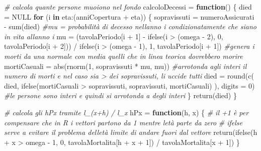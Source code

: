 \documentclass[
]{article}
\newenvironment{Shaded}{\begin{snugshade}}{\end{snugshade}}
\newcommand{\AttributeTok}[1]{\textcolor[rgb]{0.77,0.63,0.00}{#1}}
\newcommand{\CommentTok}[1]{\textcolor[rgb]{0.56,0.35,0.01}{\textit{#1}}}
\newcommand{\ConstantTok}[1]{\textcolor[rgb]{0.00,0.00,0.00}{#1}}
\newcommand{\ControlFlowTok}[1]{\textcolor[rgb]{0.13,0.29,0.53}{\textbf{#1}}}
\newcommand{\DecValTok}[1]{\textcolor[rgb]{0.00,0.00,0.81}{#1}}
\newcommand{\FunctionTok}[1]{\textcolor[rgb]{0.00,0.00,0.00}{#1}}
\newcommand{\NormalTok}[1]{#1}
\newcommand{\OtherTok}[1]{\textcolor[rgb]{0.56,0.35,0.01}{#1}}
\newcommand{\SpecialCharTok}[1]{\textcolor[rgb]{0.00,0.00,0.00}{#1}}
\begin{document}
\begin{Shaded}
\begin{Highlighting}[]
  \CommentTok{\# calcola quante persone muoiono nel fondo}
\NormalTok{  calcoloDecessi }\OtherTok{=} \ControlFlowTok{function}\NormalTok{()}
\NormalTok{  \{}
\NormalTok{    died }\OtherTok{=} \ConstantTok{NULL}
    \ControlFlowTok{for}\NormalTok{ (i }\ControlFlowTok{in}\NormalTok{ eta}\SpecialCharTok{:}\NormalTok{(anniCopertura }\SpecialCharTok{+}\NormalTok{ eta))}
\NormalTok{    \{}
\NormalTok{      sopravissuti }\OtherTok{=}\NormalTok{ numeroAssicurati }\SpecialCharTok{{-}} \FunctionTok{sum}\NormalTok{(died)}
      \CommentTok{\#mu = probabilità di decesso nell\textquotesingle{}anno i condizionatamente che siano in vita all\textquotesingle{}anno i}
\NormalTok{      mu }\OtherTok{=}\NormalTok{  (tavolaPeriodo[i }\SpecialCharTok{+} \DecValTok{1}\NormalTok{] }\SpecialCharTok{{-}} \FunctionTok{ifelse}\NormalTok{(i }\SpecialCharTok{\textgreater{}}\NormalTok{ (omega }\SpecialCharTok{{-}} \DecValTok{2}\NormalTok{), }\DecValTok{0}\NormalTok{, tavolaPeriodo[i }\SpecialCharTok{+}
                                                                               \DecValTok{2}\NormalTok{])) }\SpecialCharTok{/} \FunctionTok{ifelse}\NormalTok{(i }\SpecialCharTok{\textgreater{}}\NormalTok{ (omega }\SpecialCharTok{{-}} \DecValTok{1}\NormalTok{), }\DecValTok{1}\NormalTok{, tavolaPeriodo[i }\SpecialCharTok{+} \DecValTok{1}\NormalTok{])}
      \CommentTok{\#genera i morti da una normale con media quelli che in linea teorica dovrebbero morire}
\NormalTok{      mortiCasuali }\OtherTok{=} \FunctionTok{abs}\NormalTok{(}\FunctionTok{rnorm}\NormalTok{(}\DecValTok{1}\NormalTok{, sopravissuti }\SpecialCharTok{*}\NormalTok{ mu, mu))}
      \CommentTok{\#arrotonda agli interi il numero di morti e nel caso sia \textgreater{} dei sopravissuti, li uccide tutti}
\NormalTok{      died }\OtherTok{=} \FunctionTok{round}\NormalTok{(}\FunctionTok{c}\NormalTok{(}
\NormalTok{        died,}
        \FunctionTok{ifelse}\NormalTok{(mortiCasuali }\SpecialCharTok{\textgreater{}}\NormalTok{ sopravissuti, sopravissuti, mortiCasuali)}
\NormalTok{      ),}
      \AttributeTok{digits =} \DecValTok{0}\NormalTok{) }\CommentTok{\#le persone sono interi e quindi si arrotonda a degli interi}
\NormalTok{    \}}
    \FunctionTok{return}\NormalTok{(died)}
\NormalTok{  \}}
  
  \CommentTok{\# calcola gli hPx tramite l\_(x+h) / l\_x}
\NormalTok{  hPx }\OtherTok{=} \ControlFlowTok{function}\NormalTok{(h, x)}
\NormalTok{  \{}
    \CommentTok{\# il +1 è per compensare che in R i vettori partono da 1 mentre l\textquotesingle{}età parte da zero}
    \CommentTok{\# ifelse serve a evitare il problema dell\textquotesingle{}età limite di andare fuori dal vettore}
    \FunctionTok{return}\NormalTok{(}\FunctionTok{ifelse}\NormalTok{(h }\SpecialCharTok{+}\NormalTok{ x }\SpecialCharTok{\textgreater{}}\NormalTok{ omega }\SpecialCharTok{{-}} \DecValTok{1}\NormalTok{, }\DecValTok{0}\NormalTok{, tavolaMortalita[h }\SpecialCharTok{+}\NormalTok{ x }\SpecialCharTok{+} \DecValTok{1}\NormalTok{]) }\SpecialCharTok{/}\NormalTok{ tavolaMortalita[x }\SpecialCharTok{+} \DecValTok{1}\NormalTok{])}
\NormalTok{  \}}
  

\end{Highlighting}
\end{Shaded}
\end{document}
